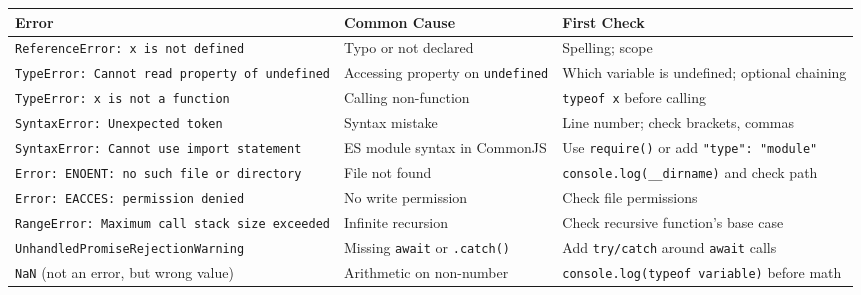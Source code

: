 \documentclass[
  justified,
  openright,
]{tufte-book}
\begin{document}
{\def\LTcaptype{none} %
\begin{longtable}[]{@{}
  >{\raggedright\arraybackslash}p{}
  >{\raggedright\arraybackslash}p{}
  >{\raggedright\arraybackslash}p{}@{}}
\toprule\noalign{}
\begin{minipage}[b]{\linewidth}\raggedright
Error
\end{minipage} & \begin{minipage}[b]{\linewidth}\raggedright
Common Cause
\end{minipage} & \begin{minipage}[b]{\linewidth}\raggedright
First Check
\end{minipage} \\
\midrule\noalign{}
\endhead
\bottomrule\noalign{}
\endlastfoot
\texttt{ReferenceError:\ x\ is\ not\ defined} & Typo or not declared &
Spelling; scope \\
\texttt{TypeError:\ Cannot\ read\ property\ of\ undefined} & Accessing
property on \texttt{undefined} & Which variable is undefined; optional
chaining \\
\texttt{TypeError:\ x\ is\ not\ a\ function} & Calling non-function &
\texttt{typeof\ x} before calling \\
\texttt{SyntaxError:\ Unexpected\ token} & Syntax mistake & Line number;
check brackets, commas \\
\texttt{SyntaxError:\ Cannot\ use\ import\ statement} & ES module syntax
in CommonJS & Use \texttt{require()} or add
\texttt{"type":\ "module"} \\
\texttt{Error:\ ENOENT:\ no\ such\ file\ or\ directory} & File not found
& \texttt{console.log(\_\_dirname)} and check path \\
\texttt{Error:\ EACCES:\ permission\ denied} & No write permission &
Check file permissions \\
\texttt{RangeError:\ Maximum\ call\ stack\ size\ exceeded} & Infinite
recursion & Check recursive function's base case \\
\texttt{UnhandledPromiseRejectionWarning} & Missing \texttt{await} or
\texttt{.catch()} & Add \texttt{try/catch} around \texttt{await}
calls \\
\texttt{NaN} (not an error, but wrong value) & Arithmetic on non-number
& \texttt{console.log(typeof\ variable)} before math \\
\end{longtable}
}
\end{document}
